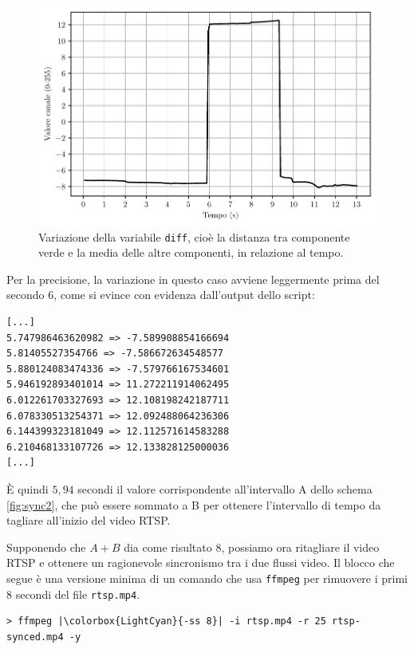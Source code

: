 \begin{figure}[htbp]
	\centering
	
	\includegraphics{res/opencv_diff.pdf}
	
	\caption{Variazione della variabile \texttt{diff}, cioè la distanza tra componente verde e la media delle altre componenti, in relazione al tempo.}
	\label{fig:sync_opencv2}
\end{figure}

Per la precisione, la variazione in questo caso avviene leggermente prima del secondo 6, come si evince con evidenza dall'output dello script:

\begin{verbatim}
[...]
5.747986463620982 => -7.589908854166694
5.81405527354766 => -7.586672634548577
5.880124083474336 => -7.579766167534601
5.946192893401014 => 11.272211914062495
6.012261703327693 => 12.108198242187711
6.078330513254371 => 12.092488064236306
6.144399323181049 => 12.112571614583288
6.210468133107726 => 12.133828125000036
[...]
\end{verbatim}

È quindi $5,94$ secondi il valore corrispondente all'intervallo A dello schema \ref{fig:sync2}, che può essere sommato a B per ottenere l'intervallo di tempo da tagliare all'inizio del video RTSP.

Supponendo che $A+B$ dia come risultato $8$, possiamo ora ritagliare il video RTSP e ottenere un ragionevole sincronismo tra i due flussi video. Il blocco che segue è una versione minima di un comando che usa \texttt{ffmpeg} per rimuovere i primi 8 secondi del file \texttt{rtsp.mp4}.

\begin{verbatim}
> ffmpeg |\colorbox{LightCyan}{-ss 8}| -i rtsp.mp4 -r 25 rtsp-synced.mp4 -y
\end{verbatim}

